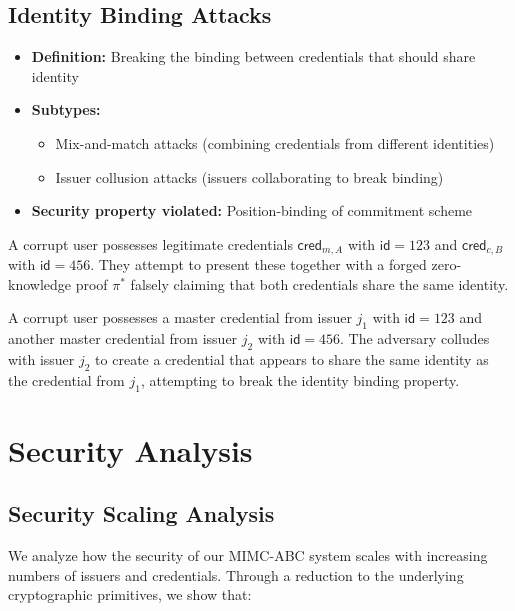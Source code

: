 \subsection{Identity Binding Attacks}
\begin{itemize}
    \item \textbf{Definition:} Breaking the binding between credentials that should share identity
    \item \textbf{Subtypes:}
    \begin{itemize}
        \item Mix-and-match attacks (combining credentials from different identities)
        \item Issuer collusion attacks (issuers collaborating to break binding)
    \end{itemize}
    \item \textbf{Security property violated:} Position-binding of commitment scheme
\end{itemize}

\begin{example}
A corrupt user possesses legitimate credentials $\mathsf{cred}_{m,A}$ with $\mathsf{id} = 123$ and $\mathsf{cred}_{c,B}$ with $\mathsf{id} = 456$. They attempt to present these together with a forged zero-knowledge proof $\pi^*$ falsely claiming that both credentials share the same identity.
\end{example}

\begin{example}
A corrupt user possesses a master credential from issuer $j_1$ with $\mathsf{id} = 123$ and another master credential from issuer $j_2$ with $\mathsf{id} = 456$. The adversary colludes with issuer $j_2$ to create a credential that appears to share the same identity as the credential from $j_1$, attempting to break the identity binding property.
\end{example}

\section{Security Analysis}
\label{sec:security-analysis}

\subsection{Security Scaling Analysis}
We analyze how the security of our MIMC-ABC system scales with increasing numbers of issuers and credentials. Through a reduction to the underlying cryptographic primitives, we show that:

